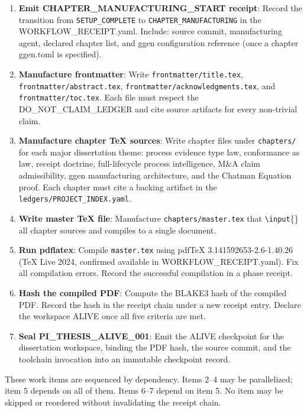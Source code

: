 \begin{enumerate}
  \item \textbf{Emit CHAPTER\_MANUFACTURING\_START receipt}: Record the transition from
    \texttt{SETUP\_COMPLETE} to \texttt{CHAPTER\_MANUFACTURING} in the WORKFLOW\_RECEIPT.yaml.
    Include: source commit, manufacturing agent, declared chapter list, and ggen configuration
    reference (once a chapter ggen.toml is specified).

  \item \textbf{Manufacture frontmatter}: Write \texttt{frontmatter/title.tex},
    \texttt{frontmatter/abstract.tex}, \texttt{frontmatter/acknowledgments.tex}, and
    \texttt{frontmatter/toc.tex}. Each file must respect the DO\_NOT\_CLAIM\_LEDGER and cite
    source artifacts for every non-trivial claim.

  \item \textbf{Manufacture chapter TeX sources}: Write chapter files under
    \texttt{chapters/} for each major dissertation theme: process evidence type law,
    conformance as law, receipt doctrine, full-lifecycle process intelligence, M\&A claim
    admissibility, ggen manufacturing architecture, and the Chatman Equation proof. Each
    chapter must cite a backing artifact in the \texttt{ledgers/PROJECT\_INDEX.yaml}.

  \item \textbf{Write master TeX file}: Manufacture \texttt{chapters/master.tex} that
    \texttt{\textbackslash input}\{\} all chapter sources and compiles to a single document.

  \item \textbf{Run pdflatex}: Compile \texttt{master.tex} using pdfTeX 3.141592653-2.6-1.40.26
    (TeX Live 2024, confirmed available in WORKFLOW\_RECEIPT.yaml). Fix all compilation errors.
    Record the successful compilation in a phase receipt.

  \item \textbf{Hash the compiled PDF}: Compute the BLAKE3 hash of the compiled PDF.
    Record the hash in the receipt chain under a new receipt entry.
    Declare the workspace ALIVE once all five criteria are met.

  \item \textbf{Seal PI\_THESIS\_ALIVE\_001}: Emit the ALIVE checkpoint for the
    dissertation workspace, binding the PDF hash, the source commit, and the toolchain
    invocation into an immutable checkpoint record.
\end{enumerate}

These work items are sequenced by dependency. Items 2--4 may be parallelized; item 5 depends
on all of them. Items 6--7 depend on item 5. No item may be skipped or reordered without
invalidating the receipt chain.
